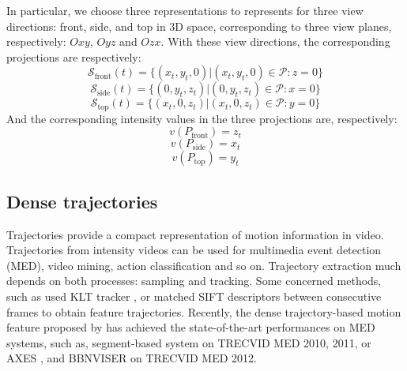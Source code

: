 \documentclass[final,3p,times,twocolumn]{elsarticle}
\begin{document}
In particular, we choose three representations to represents for three view directions: front, side, and top in 3D space, corresponding to three view planes, respectively: $Oxy$, $Oyz$ and $Ozx$. With these view directions, the corresponding projections are respectively:
\begin{equation}
	\mathcal{S}_\text{front}(t) = \{(x_t,y_t,0)\vert(x_t,y_t,0) \in \mathcal{P}:z=0\}
\end{equation}
\begin{equation}
	\mathcal{S}_\text{side}(t) = \{(0,y_t,z_t)\vert(0,y_t,z_t) \in \mathcal{P}:x=0\}
\end{equation}
\begin{equation}
	\mathcal{S}_\text{top}(t) = \{(x_t,0,z_t)\vert(x_t,0,z_t) \in \mathcal{P}:y=0\}
\end{equation}
And the corresponding intensity values in the three projections are, respectively:
\begin{equation}
	v(P_\text{front}) = z_t
\end{equation}
\begin{equation}
	v(P_\text{side}) = x_t
\end{equation}
\begin{equation}
	v(P_\text{top}) = y_t
\end{equation}

\subsection{Dense trajectories}
Trajectories provide a compact representation of motion information in video.
Trajectories from intensity videos can be used for multimedia event detection (MED), video mining, action classification and so on.
Trajectory extraction much depends on both processes: sampling and tracking.
Some concerned methods, such as \cite{matikainen2009trajectons, messing2009activity} used KLT tracker \cite{lucas1981iterative}, or \cite{sun2009hierarchical} matched SIFT descriptors between consecutive frames to obtain feature trajectories.
Recently, the dense trajectory-based motion feature proposed by \cite{wang2011densetraj} has achieved the state-of-the-art performances on MED systems, such as, segment-based system \cite{phan2014multimedia} on TRECVID MED 2010, 2011, or AXES \cite{oneata2012axes}, and BBNVISER \cite{natarajan2012bbn} on TRECVID MED 2012.
\end{document}
